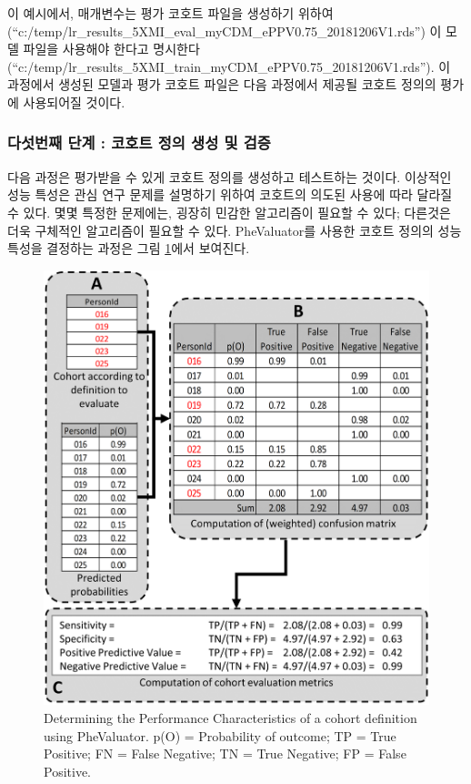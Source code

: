 \documentclass[11pt]{book}
\theoremstyle{definition}
\theoremstyle{definition}
\theoremstyle{definition}
\theoremstyle{remark}
\begin{document}
이 예시에서, 매개변수는 평가 코호트 파일을 생성하기 위하여
(``c:/temp/lr\_results\_5XMI\_eval\_myCDM\_ePPV0.75\_20181206V1.rds'')
이 모델 파일을 사용해야 한다고 명시한다
(``c:/temp/lr\_results\_5XMI\_train\_myCDM\_ePPV0.75\_20181206V1.rds'').
이 과정에서 생성된 모델과 평가 코호트 파일은 다음 과정에서 제공될 코호트
정의의 평가에 사용되어질 것이다.

\subsubsection*{다섯번째 단계 : 코호트 정의 생성 및 검증}\label{------}

다음 과정은 평가받을 수 있게 코호트 정의를 생성하고 테스트하는 것이다.
이상적인 성능 특성은 관심 연구 문제를 설명하기 위하여 코호트의 의도된
사용에 따라 달라질 수 있다. 몇몇 특정한 문제에는, 굉장히 민감한
알고리즘이 필요할 수 있다; 다른것은 더욱 구체적인 알고리즘이 필요할 수
있다. PheValuator를 사용한 코호트 정의의 성능 특성을 결정하는 과정은
그림 \ref{fig:phevaluatorDiagram}에서 보여진다.

\begin{figure}

{\centering \includegraphics[width=1\linewidth]{images/ClinicalValidity/PheValuatorEvaluation} 

}

\caption{Determining the Performance Characteristics of a cohort definition using PheValuator. p(O) = Probability of outcome; TP = True Positive; FN = False Negative; TN = True Negative; FP = False Positive.}\label{fig:phevaluatorDiagram}
\end{figure}
\end{document}
